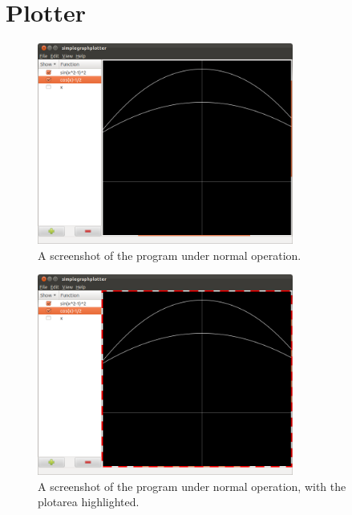 \documentclass[a4paper,11pt]{kth-mag}
\begin{document}
\section{Plotter}
\begin{figure}[ht]
\begin{center}
    \includegraphics[width=0.75\textwidth]{screenshot00.png}
    \caption{\small{A screenshot of the program under normal operation.}}
   \label{fig:screenshot}
\end{center}
\end{figure}
\begin{figure}[ht]
\begin{center}
    \includegraphics[width=0.75\textwidth]{screenshot00_plotarea.png}
    \caption{\small{A screenshot of the program under normal operation, with
    the plotarea highlighted.}}
   \label{fig:screenshotplotarea}
\end{center}
\end{figure}
\end{document}
